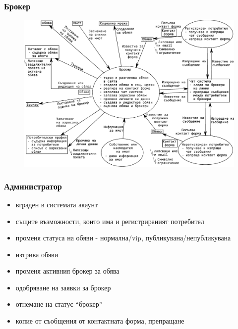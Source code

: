 \documentclass[12pt]{beamer}
\begin{document}
\begin{frame}[fragile]
\frametitle{Брокер}
	\begin{figure}[h]
	\centering
	\includegraphics[scale=0.50]{flow-broker}
	\end{figure}
\end{frame}

\begin{frame}[fragile]
\frametitle{Администратор}
		\begin{itemize}
		\item вграден в системата акаунт
		\item същите възможности, които има и регистрираният потребител
		\item променя статуса на обяви - нормална/vip, публикувана/непубликувана
		\item изтрива обяви
		\item променя активния брокер за обява
		\item одобряване на заявки за брокер
		\item отнемане на статус ``брокер''
		\item копие от съобщения от контактната форма, препращане
		\end{itemize}
\end{frame}
\end{document}
